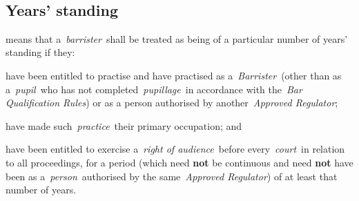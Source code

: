     \subsection{Years' standing } means that a~\emph{barrister}~shall be
  treated as being of a particular number of years' standing if they: \al \item have been entitled to practise and have practised as
  a~\emph{Barrister}~(other than as a~\emph{pupil}~who has not
  completed~\emph{pupillage}~in accordance with the~\emph{Bar
  Qualification Rules}) or as a person authorised by
  another~\emph{Approved Regulator}; \item have made
  such~\emph{practice}~their primary occupation; and  \item have been
  entitled to exercise a~\emph{right of audience}~before
  every~\emph{court}~in relation to all proceedings,\la%
  for a period (which
  need \textbf{not} be continuous and need \textbf{not} have been as
  a~\emph{person}~authorised by the same~\emph{Approved Regulator}) of
  at least that number of years.
